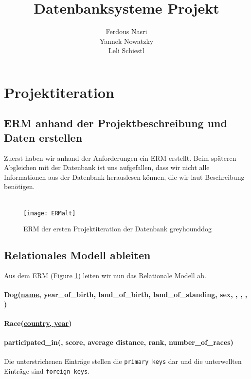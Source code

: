 \documentclass[10pt,a4paper]{article}
\author{Ferdous Nasri \\ Yannek Nowatzky \\ Leli Schiestl}
\title{Datenbanksysteme Projekt}
\begin{document}
	\maketitle
	\newpage
	\section{Projektiteration}
	\subsection{ERM anhand der Projektbeschreibung und Daten erstellen}
	Zuerst haben wir anhand der Anforderungen ein ERM erstellt. Beim späteren Abgleichen mit der Datenbank ist uns aufgefallen, dass wir nicht alle Informationen aus der Datenbank herauslesen können, die wir laut Beschreibung benötigen.\\ \\	
	\begin{figure}[h]
		\centering
		\texttt{[image: ERMalt]}
		\caption[ERM der ersten Projektiteration]{ERM der ersten Projektiteration der Datenbank greyhounddog}
		\label{fig:ERMalt}
	\end{figure}
	
	\subsection{Relationales Modell ableiten }
	Aus dem ERM (Figure \ref{fig:ERMalt}) leiten wir nun das Relationale Modell ab.\\
	\\\textsf{
	\textbf{Dog(\underline{name}, year\_of\_birth, land\_of\_birth, land\_of\_standing, sex, , , , )
	\\ \\
	Race(\underline{country, year})
	\\ \\
	participated\_in(, score, average distance, rank, number\_of\_races)}}
	\\ \\
	Die unterstrichenen Einträge stellen die \texttt{primary keys} dar und die unterwellten Einträge sind \texttt{foreign keys}.
\end{document}

